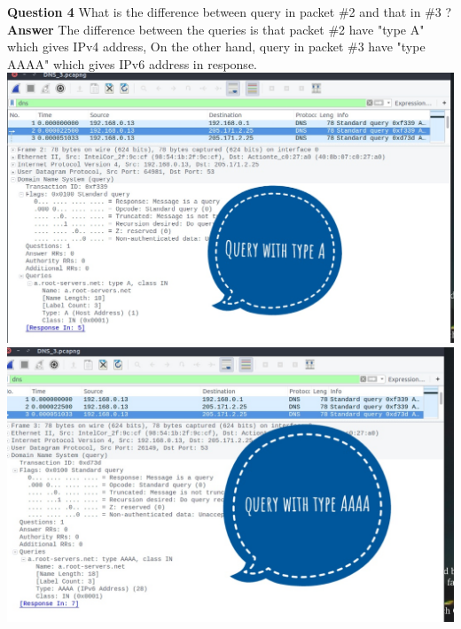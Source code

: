 \documentclass[14pt]{extarticle}
\begin{document}
    \noindent
    \textbf{\large Question 4}
    What is the difference between query in packet \#2 and that in \#3 ?\\[10pt]
    \textbf{\large Answer}
    The difference between the queries is that packet \#2 have "type A" which gives IPv4 address, On the other hand, query in packet \#3 have "type AAAA" which gives IPv6 address in response.\\[10pt]
    \includegraphics[scale=0.45]{3_4_1}\\[10pt]
    \includegraphics[scale=0.45]{3_4_2}\\[10pt]
    \vspace{1cm}
\end{document}
